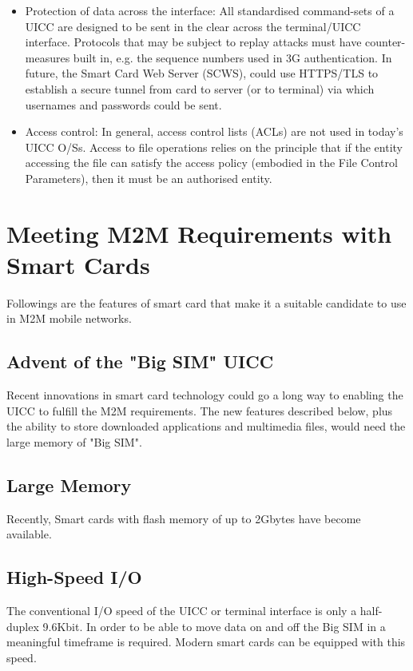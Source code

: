 \documentclass[12pt]{article}
\begin{document}
\begin{itemize}
\item Protection of data across the interface: All standardised command-sets of a UICC are designed to be sent in the clear across the terminal/UICC interface. Protocols that may be subject to replay attacks must have counter-measures built in, e.g. the sequence numbers used in 3G authentication. In future, the Smart Card Web Server (SCWS), could use HTTPS/TLS to establish a secure tunnel from card to server (or to terminal) via which usernames and passwords could be sent.

\item Access control: In general, access control lists (ACLs) are not used in today’s UICC O/Ss. Access to file operations relies on the principle that if the entity accessing the file can satisfy the access policy (embodied in the File Control Parameters), then it must be an authorised entity.
\end{itemize}



\section{Meeting M2M Requirements with Smart Cards}
Followings are the features of smart card that make it a suitable candidate to use in M2M mobile networks.
\subsection{Advent of the "Big SIM" UICC}
Recent innovations in smart card technology could go a long way to enabling the UICC to fulfill the M2M requirements. The new features described below, plus the ability to store downloaded applications and multimedia files, would need the large memory of "Big SIM". 

\subsection{Large Memory}
Recently, Smart cards with flash memory of up to 2Gbytes have become available.

\subsection{High-Speed I/O}
The conventional I/O speed of the UICC or terminal interface is only a half-duplex 9.6Kbit. In order to be able to move data on and off the Big SIM in a meaningful timeframe is required. Modern smart cards can be equipped with this speed.
\end{document}
